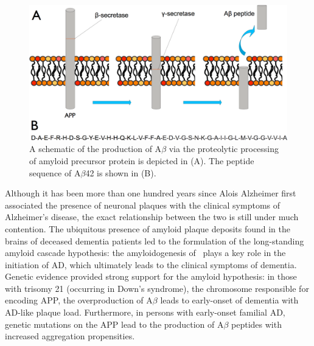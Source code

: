 \begin{figure}
\centering
\includegraphics[width=6in]{figures/introduction/AD_abeta_app.pdf}
\caption[APP processing]{A schematic of the production of A$\beta$ via the proteolytic processing of amyloid precursor protein is depicted in (A). The peptide sequence of A$\beta$42 is shown in (B).}
\label{fig:AD_abeta_app}
\end{figure}

Although it has been more than one hundred years since Alois Alzheimer first associated the presence of neuronal plaques with the clinical symptoms of Alzheimer's disease, the exact relationship between the two is still under much contention.\cite{Hardy:2002dh} The ubiquitous presence of amyloid plaque deposits found in the brains of deceased dementia patients led to the formulation of the long-standing amyloid cascade hypothesis: the amyloidogenesis of \abeta\ plays a key role in the initiation of AD, which ultimately leads to the clinical symptoms of dementia.\cite{Hardy:2002dh} Genetic evidence provided strong support for the amyloid hypothesis: in those with trisomy 21 (occurring in Down's syndrome), the chromosome responsible for encoding APP,  the overproduction of A$\beta$ leads to early-onset of dementia with AD-like plaque load.\cite{Goate:1991kc,LevyLahad:1995vga} Furthermore, in persons with early-onset familial AD, genetic mutations on the APP lead to the production of A$\beta$ peptides with increased aggregation propensities.\cite{Tam:2012vz}

